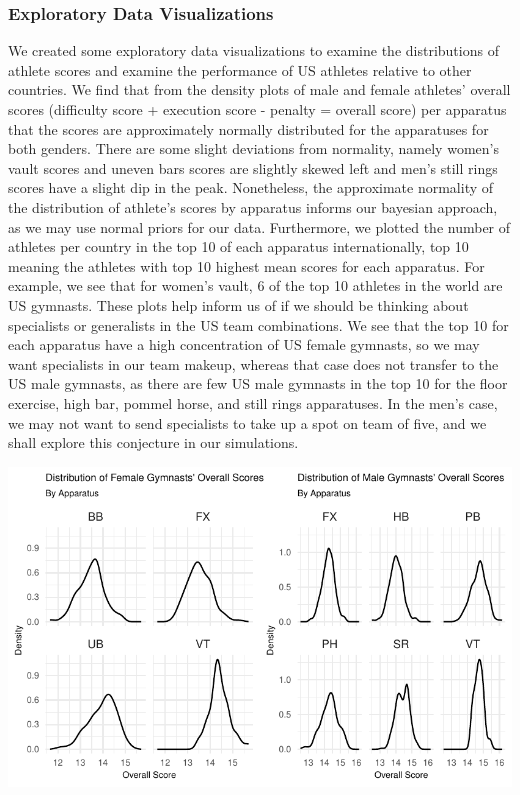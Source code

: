 \documentclass[
  letterpaper,
  DIV=11,
  numbers=noendperiod]{scrartcl}
\begin{document}
\hypertarget{exploratory-data-visualizations}{%
\subsubsection{Exploratory Data
Visualizations}\label{exploratory-data-visualizations}}

We created some exploratory data visualizations to examine the
distributions of athlete scores and examine the performance of US
athletes relative to other countries. We find that from the density
plots of male and female athletes' overall scores (difficulty score +
execution score - penalty = overall score) per apparatus that the scores
are approximately normally distributed for the apparatuses for both
genders. There are some slight deviations from normality, namely women's
vault scores and uneven bars scores are slightly skewed left and men's
still rings scores have a slight dip in the peak. Nonetheless, the
approximate normality of the distribution of athlete's scores by
apparatus informs our bayesian approach, as we may use normal priors for
our data. Furthermore, we plotted the number of athletes per country in
the top 10 of each apparatus internationally, top 10 meaning the
athletes with top 10 highest mean scores for each apparatus. For
example, we see that for women's vault, 6 of the top 10 athletes in the
world are US gymnasts. These plots help inform us of if we should be
thinking about specialists or generalists in the US team combinations.
We see that the top 10 for each apparatus have a high concentration of
US female gymnasts, so we may want specialists in our team makeup,
whereas that case does not transfer to the US male gymnasts, as there
are few US male gymnasts in the top 10 for the floor exercise, high bar,
pommel horse, and still rings apparatuses. In the men's case, we may not
want to send specialists to take up a spot on team of five, and we shall
explore this conjecture in our simulations.

\includegraphics{Main_files/figure-pdf/score-distributions-1.pdf}
\end{document}
